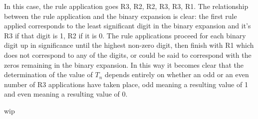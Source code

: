 \documentclass{article}
\begin{document}
\par

In this case, the rule application goes R3, R2, R2, R3, R3, R1.  The relationship between the rule application and the binary expansion is clear: the first rule applied corresponds to the least significant digit in the binary expansion and it's R3 if that digit is 1, R2 if it is 0.  The rule applications proceed for each binary digit up in significance until the highest non-zero digit, then finish with R1 which does not correspond to any of the digits, or could be said to correspond with the zeros remaining in the binary expansion.  In this way it becomes clear that the determination of the value of $T_n$ depends entirely on whether an odd or an even number of R3 applications have taken place, odd meaning a resulting value of 1 and even meaning a resulting value of 0.

\par

wip
\end{document}
